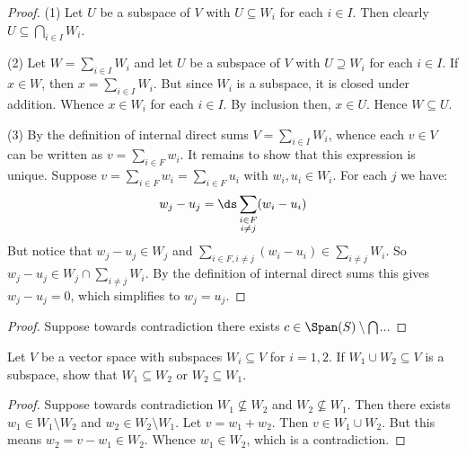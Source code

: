 \documentclass[11pt,twoside,openany]{memoir}
\begin{document}
        {\color{red} \begin{proof}
            (1) Let $U$ be a subspace of $V$ with $U \subseteq W_i$ for each $i \in I$. Then clearly $U \subseteq \bigcap_{i \in I}W_i$. \nl

            \noindent (2) Let $W = \sum_{i \in I}W_i$ and let $U$ be a subspace of $V$ with $U \supseteq W_i$ for each $i \in I$. If $x \in W$, then $x = \sum_{i \in I}W_i$. But since $W_i$ is a subspace, it is closed under addition. Whence $x \in W_i$ for each $i \in I$. By inclusion then, $x \in U$. Hence $W \subseteq U$. \nl

            \noindent (3) By the definition of internal direct sums $V = \sum_{i \in I}W_i$, whence each $v \in V$ can be written as $v = \sum_{i \in F}w_i$. It remains to show that this expression is unique. Suppose $v = \sum_{i \in F}w_i = \sum_{i \in F}u_i$ with $w_i,u_i \in W_i$. For each $j$ we have:
                \begin{equation*}
                \begin{split}
                    w_j - u_j = \ds \sum_{\mathclap{\substack{ i \in F \\ i \neq j }}} (w_i - u_i)
                \end{split}
                \end{equation*}
            But notice that $w_j - u_j \in W_j$ and $ \sum_{i \in F, i \neq j } (w_i - u_i) \in \sum_{i \neq j}W_i$. So $w_j - u_j \in W_j \cap \sum_{i \neq j}W_i$. By the definition of internal direct sums this gives $w_j - u_j = 0$, which simplifies to $w_j = u_j$. 
        \end{proof}}
    \begin{exercise}
        
    \end{exercise}
        {\color{red} \begin{proof}
            Suppose towards contradiction there exists $c \in \Span(S) \setminus \bigcap$...
        \end{proof}}
    \begin{exercise}
        Let $V$ be a vector space with subspaces $W_i \subseteq V$ for $i = 1,2$. If $W_1 \cup W_2 \subseteq V$ is a subspace, show that $W_1 \subseteq W_2$ or $W_2 \subseteq W_1$.
    \end{exercise}
        {\color{red} \begin{proof}
            Suppose towards contradiction $W_1 \not\subseteq W_2$ and $W_2 \not\subseteq W_1$. Then there exists $w_1 \in W_1 \setminus W_2$ and $w_2 \in W_2 \setminus W_1$. Let $v = w_1 + w_2$. Then $v \in W_1 \cup W_2$. But this means $w_2 = v - w_1 \in W_2$. Whence $w_1 \in W_2$, which is a contradiction.
        \end{proof}}
\end{document}
